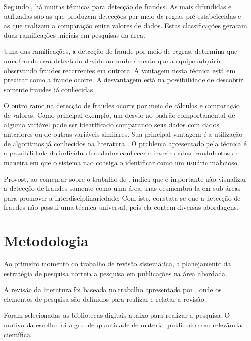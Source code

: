\documentclass[smallextended]{svjour3}
\begin{document}
Segundo \cite{Fawcett1997}, há muitas técnicas para detecção de fraudes. As mais difundidas e utilizadas são as que produzem detecções por meio de regras pré estabelecidas e as que realizam a comparação entre valores de dados. Estas classificações geraram duas ramificações iniciais em pesquisas da área.

Uma das ramificações, a detecção de fraude por meio de regras, determina que uma fraude será detectada devido ao conhecimento que a equipe adquiriu observando fraudes recorrentes em outrora. A vantagem nesta técnica está em preditar como a fraude ocorre. A desvantagem está na possibilidade de descobrir somente fraudes já conhecidas.

O outro ramo na detecção de fraudes ocorre por meio de cálculos e comparação de valores. Como principal exemplo, um desvio no padrão comportamental de alguma variável pode ser identificado comparando seus dados com dados anteriores ou de outras variáveis similares. Sua principal vantagem é a utilização de algoritmos já conhecidos na literatura \citep{Fawcett1997}. O problema apresentado pela técnica é a possibilidade do indivíduo fraudador conhecer e inserir dados fraudulentos de maneira em que o sistema não consiga o identificar como um usuário malicioso.

Provost, ao comentar sobre o trabalho de \cite{Bolton2002}, indica que é importante não visualizar a detecção de fraudes somente como uma área, mas desmembrá-la em sub-áreas para promover a interdisciplinariedade. Com isto, constata-se que a detecção de fraudes não possui uma técnica universal, pois ela contem diversas abordagens. 

\section{Metodologia}
\label{sec:3}

Ao primeiro momento do trabalho de revisão sistemática, o planejamento da estratégia de pesquisa norteia a pesquisa em publicações na área abordada.

A revisão da literatura foi baseada no trabalho apresentado por \cite{Kitchenham07guidelinesfor}, onde os elementos de pesquisa são definidos para realizar e relatar a revisão.

Foram selecionadas as bibliotecas digitais abaixo para realizar a pesquisa. O motivo da escolha foi a grande quantidade de material publicado com relevância científica.
\end{document}
